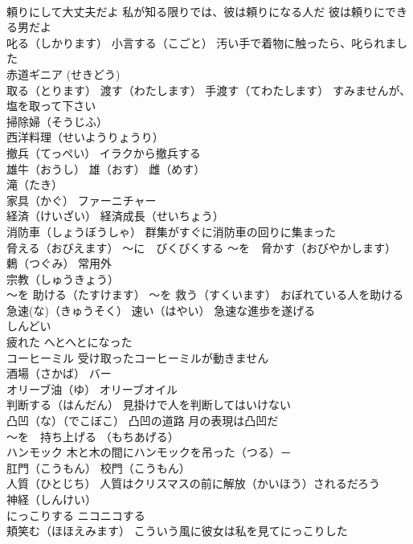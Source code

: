 \documentclass[8pt]{extreport}
\begin{document}
\begin{CJK}{UTF8}{min}
\\	頼りにして大丈夫だよ 私が知る限りでは、彼は頼りになる人だ 彼は頼りにできる男だよ
\\	叱る（しかります） 小言する（こごと） 汚い手で着物に触ったら、叱られました
\\	赤道ギニア (せきどう)
\\	取る（とります） 渡す（わたします） 手渡す（てわたします） すみませんが、塩を取って下さい
\\	掃除婦（そうじふ）
\\	西洋料理（せいようりょうり）
\\	撤兵（てっぺい） イラクから撤兵する
\\	雄牛（おうし） 雄（おす） 雌（めす）
\\	滝（たき）
\\	家具（かぐ） ファーニチャー
\\	経済（けいざい） 経済成長（せいちょう）
\\	消防車（しょうぼうしゃ） 群集がすぐに消防車の回りに集まった
\\	脅える（おびえます） ～に　びくびくする ～を　脅かす（おびやかします）
\\	鶫（つぐみ） 常用外
\\	宗教（しゅうきょう）
\\	～を 助ける（たすけます） ～を 救う（すくいます） おぼれている人を助ける
\\	急速(な)（きゅうそく） 速い（はやい） 急速な進歩を遂げる
\\	しんどい　　
\\	疲れた へとへとになった
\\	コーヒーミル 受け取ったコーヒーミルが動きません
\\	酒場（さかば） バー
\\	オリーブ油（ゆ） オリーブオイル
\\	判断する（はんだん） 見掛けで人を判断してはいけない
\\	凸凹（な）（でこぼこ） 凸凹の道路 月の表現は凸凹だ
\\	～を　持ち上げる （もちあげる）
\\	ハンモック 木と木の間にハンモックを吊った（つる）－
\\	肛門（こうもん） 校門（こうもん）
\\	人質（ひとじち） 人質はクリスマスの前に解放（かいほう）されるだろう
\\	神経（しんけい）
\\	にっこりする ニコニコする
\\	頬笑む（ほほえみます） こういう風に彼女は私を見てにっこりした

\end{CJK}
\end{document}
